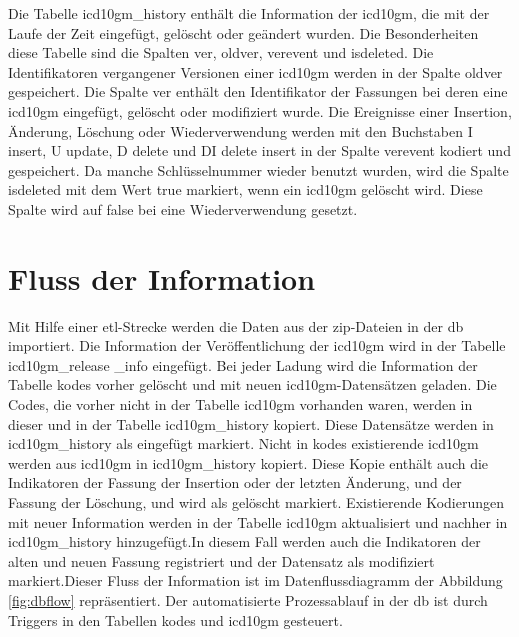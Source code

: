 Die Tabelle \textsf{icd10gm\_history} enthält die Information der \ac{icd10gm}, die mit der Laufe der Zeit eingefügt, gelöscht oder geändert wurden. Die Besonderheiten diese Tabelle sind die Spalten \textsf{ver}, \textsf{oldver}, \textsf{verevent} und \textsf{isdeleted}. Die Identifikatoren vergangener Versionen einer \ac{icd10gm} werden in der Spalte \textsf{oldver} gespeichert. Die Spalte \textsf{ver} enthält den Identifikator der Fassungen bei deren eine \ac{icd10gm} eingefügt, gelöscht oder modifiziert wurde. Die Ereignisse einer Insertion, Änderung, Löschung oder Wiederverwendung werden mit den Buchstaben \textsf{I} \glqq\textsf{insert}\grqq{}, \textsf{U} \glqq\textsf{update}\grqq{}, \textsf{D} \glqq\textsf{delete}\grqq{} und \textsf{DI} \glqq\textsf{delete insert}\grqq{} in der Spalte \textsf{verevent} kodiert und gespeichert. Da manche Schlüsselnummer wieder benutzt wurden, wird die Spalte \textsf{isdeleted} mit dem Wert \textsf{true} markiert, wenn ein \ac{icd10gm} gelöscht wird. Diese Spalte wird auf \textsf{false} bei eine Wiederverwendung gesetzt.

\section{Fluss der Information} \label{dbrun}

Mit Hilfe einer \ac{etl}-Strecke werden die Daten aus der \ac{zip}-Dateien in der \ac{db} importiert. Die Information der Veröffentlichung der \ac{icd10gm} wird in der Tabelle \textsf{icd10gm\_release \_info} eingefügt. Bei jeder Ladung wird die Information der Tabelle \textsf{kodes} vorher gelöscht und mit neuen \ac{icd10gm}-Datensätzen geladen. Die Codes, die vorher nicht in der Tabelle \textsf{icd10gm} vorhanden waren, werden in dieser und in der Tabelle \textsf{icd10gm\_history} kopiert. Diese Datensätze werden in \textsf{icd10gm\_history} als eingefügt markiert. Nicht in \textsf{kodes} existierende \ac{icd10gm} werden aus \textsf{icd10gm} in \textsf{icd10gm\_history} kopiert. Diese Kopie enthält auch die Indikatoren der Fassung der Insertion oder der letzten Änderung, und der Fassung der Löschung, und wird als gelöscht markiert. Existierende Kodierungen mit neuer Information werden in der Tabelle \textsf{icd10gm} aktualisiert und nachher in \textsf{icd10gm\_history} hinzugefügt.In diesem Fall werden auch die Indikatoren der alten und neuen Fassung registriert und der Datensatz als modifiziert markiert.Dieser Fluss der Information ist im Datenflussdiagramm der Abbildung \ref{fig:dbflow} repräsentiert. Der automatisierte Prozessablauf in der \ac{db} ist durch Triggers in den Tabellen \textsf{kodes} und \textsf{icd10gm} gesteuert.

